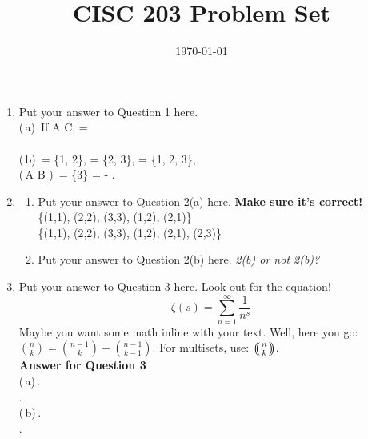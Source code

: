\documentclass{article}
\title{CISC 203 Problem Set \PSNumber}
\author{\MyName}
\date{\today}
\def\multiset#1#2{\ensuremath{\left(\kern-.3em\left(\genfrac{}{}{0pt}{}{#1}{#2}\right)\kern-.3em\right)}}
\begin{document}
\maketitle

\begin{enumerate}
    \item Put your answer to Question 1 here.
    \\(\,a)\,  If A \subseteq C,  \cup {} =  \\ \cup {}\cup {}\cup {}
    \\(\,b)\,  = \{1, 2\},  = \{2, 3\},  \cup {} = \{1, 2, 3\}, \\ (\,A \cup B )\, \triangle {} = \{3\} =  - . 

    \item
    \begin{enumerate}
        \item Put your answer to Question 2(a) here. \textbf{Make sure it's correct!}
        \\ \{(1,1), (2,2), (3,3), (1,2), (2,1)\}
        \\ \{(1,1), (2,2), (3,3), (1,2), (2,1), (2,3)\}

        
        \item Put your answer to Question 2(b) here. \textit{2(b) or not 2(b)?}
    \end{enumerate}
    
    \item Put your answer to Question 3 here. Look out for the equation!
    \begin{equation}
        \zeta(s) = \sum_{n = 1}^{\infty} \frac{1}{n^{s}}
    \end{equation}
    Maybe you want some math inline with your text. Well, here you go: $\binom{n}{k} = \binom{n-1}{k} + \binom{n-1}{k-1}$. For multisets, use: $\multiset{n}{k}$.
    \\ \textbf{Answer for Question 3}
    \\(\,a)\,. \\. 
    \\(\,b)\,.
    \\ .


\end{enumerate}
\end{document}
